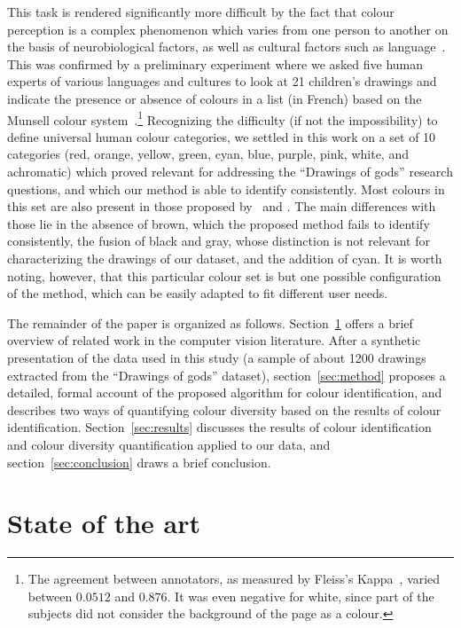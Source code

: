 \documentclass[11pt,a4paper]{article}
\begin{document}
This task is rendered significantly more difficult by the fact that colour perception is a complex phenomenon which varies from one person to another on the basis of neurobiological factors, as well as cultural factors such as language~\cite[][pp. 35 and 87]{pastoureau2017}. This was confirmed by a preliminary experiment where we asked five human experts of various languages and cultures to look at 21 children's drawings and indicate the presence or absence of colours in a list (in French) based on the Munsell colour system~\cite{Munsell1912}.\footnote{The agreement between annotators, as measured by Fleiss's Kappa~\cite{Fleiss1971}, varied between $0.0512$ and $0.876$. It was even negative for white, since part of the subjects did not consider the background of the page as a colour.} Recognizing the difficulty (if not the impossibility) to define universal human colour categories, we settled in this work on a set of 10 categories (red, orange, yellow, green, cyan, blue, purple, pink, white, and achromatic) which proved relevant for addressing the ``Drawings of gods'' research questions, and which our method is able to identify consistently. Most colours in this set are also present in those proposed by~\citet{berlinkay1969} and \citet{pastoureau2017}. The main differences with those lie in the absence of brown, which the proposed method fails to identify consistently, the fusion of black and gray, whose distinction is not relevant for characterizing the drawings of our dataset, and the addition of cyan. It is worth noting, however, that this particular colour set is but one possible configuration of the method, which can be easily adapted to fit different user needs.

The remainder of the paper is organized as follows. Section~\ref{sec:state_of_the_art} offers a brief overview of related work in the computer vision literature. After a synthetic presentation of the data used in this study (a sample of about 1200 drawings extracted from the ``Drawings of gods'' dataset), section~\ref{sec:method} proposes a detailed, formal account of the proposed algorithm for colour identification, and describes two ways of quantifying colour diversity based on the results of colour identification. Section~\ref{sec:results} discusses the results of colour identification and colour diversity quantification applied to our data, and section~\ref{sec:conclusion} draws a brief conclusion.


\section{State of the art}
\label{sec:state_of_the_art}
\end{document}
